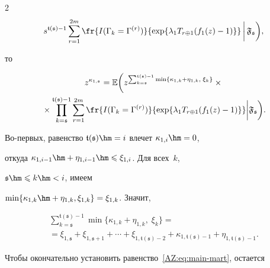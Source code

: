 \begin{multicols}{2}
\begin{multline*}
{    s}^{\mathfrak t(\mathfrak s)-1}\sum\limits_{r=1}^{2m}

  \fr{I(\Gamma_{k}=\Gamma^{(r)})}%

  {\exp\{\lambda_{1}T_{r\oplus1}(f_{1}(z)-1)\}}\,\bigg|\,\mathfrak{F}_{\mathfrak 

s}\biggr),

\end{multline*}

то

\begin{multline*}

  z^{\kappa_{1,\mathfrak s}}=

  \mathbb{E}\biggl(z^{\sum\nolimits_{k=\mathfrak s}^{\mathfrak t(\mathfrak s)-1}

    \min\{\kappa_{1,k}+\eta_{1,k},\;\xi_{k}\}}\times{}\\

    {}\times \prod\limits_{k=\mathfrak s}^{\mathfrak

    t(\mathfrak s)-1}

  \sum\limits_{r=1}^{2m}\fr{I(\Gamma_{k}=\Gamma^{(r)})}%

  {\exp\{\lambda_{1}T_{r\oplus1}(f_{1}(z)-1)\}}\bigg|\mathfrak{F}_{\mathfrak 

s}\bigg).

\end{multline*}

Во-первых, равенство $\mathfrak t(\mathfrak s)\hm=i$ влечет $\kappa_{1,i}\hm=0$,

откуда $\kappa_{1,i-1}\hm+\eta_{1,i-1}\hm\leqslant\xi_{1,i}$. Для всех~$k$,

$\mathfrak {s} \hm\leqslant k\hm<i$, имеем

$\min\{\kappa_{1,k}\hm+\eta_{1,k},\xi_{1,k}\}=\xi_{1,k}$. Значит,

\begin{multline*}

  \sum\limits_{k=\mathfrak s}^{\mathfrak t(\mathfrak s)-1}

  \min\{\kappa_{1,k}+\eta_{1,k},\;\xi_{k}\}={}\\

  {}= \xi_{1,\mathfrak

    s}+\xi_{1,\mathfrak s+1}+\cdots+\xi_{1,\mathfrak t(\mathfrak s)-2}+

  \kappa_{1,\mathfrak t(\mathfrak s)-1}+\eta_{1,\mathfrak t(\mathfrak s)-1}.

\end{multline*}

Чтобы окончательно установить равенство~\eqref{AZ:eq:main-mart}, остается


\end{multicols}
